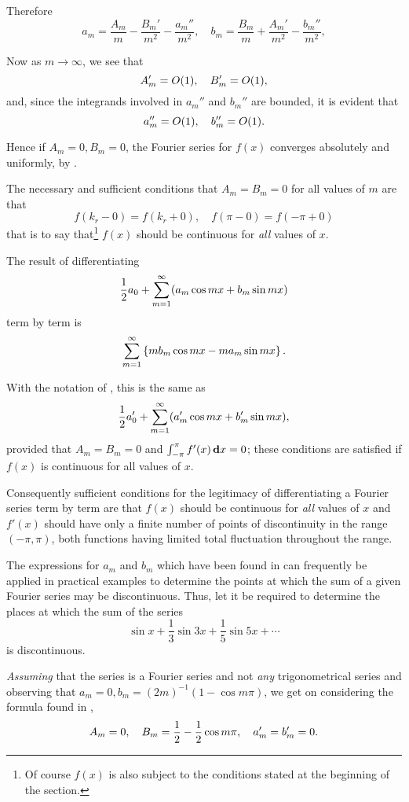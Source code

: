 Therefore
$$
a_{m} =
\frac{A_{m}}{m}
- \frac{B_{m}'}{m^{2}}
- \frac{a_{m}''}{m^{2}},
\quad
b_{m} =
\frac{B_{m}}{m}
+ \frac{A_{m}'}{m^{2}}
- \frac{b_{m}''}{m^{2}},
$$

Now as $m \rightarrow \infty$, we see that
$$
A_{m}' = O(1),
\quad
B_{m}' = O(1),
$$
and, since the integrands involved in $a_{m}''$ and $b_{m}''$
are bounded, it is evident that
$$
a_{m}'' = O(1),
\quad
b_{m}'' = O(1).
$$

Hence if $A_{m}=0, B_{m}=0$, the Fourier series for $f(x)$ converges
absolutely and uniformly, by .

The necessary and sufficient conditions that
$A_{m} = B_{m} = 0$ for all values of $m$ are that
$$
f(k_{r} - 0) = f(k_{r} + 0),
\quad
f(\pi - 0) = f(-\pi + 0)
$$
that is to say that\footnote{Of course $f(x)$ is also subject to the conditions stated at the
beginning of the section.} $f(x)$ should be continuous for \emph{all} values of $x$.

The result of differentiating
$$
\frac{1}{2} a_{0}
+ \sum_{m=1}^{\infty} (a_{m} \cos mx + b_{m} \sin mx)
$$
term by term is
$$
\sum_{m=1}^{\infty} \left\{ 
  m b_{m} \cos mx
  -
  m a_{m} \sin mx
 \right\}.
$$
%
%

With the notation of , this is the same as
$$
\frac{1}{2} a_{0}'
+
\sum_{m=1}^{\infty} ( a_{m}' \cos mx + b_{m}' \sin mx),
$$
provided that $A_{m} = B_{m} = 0$ and
$\int_{-\pi}^{\pi} f'(x) \, \mathbf{d} x = 0$;
these conditions are satisfied if $f(x)$ is continuous for all values of
$x$.

Consequently sufficient conditions for the legitimacy of
differentiating a Fourier series term by term are that $f(x)$ should be
continuous for \emph{all} values of $x$ and $f'(x)$ should have only a finite
number of points of discontinuity in the range $(-\pi, \pi)$, both
functions having limited total fluctuation throughout the range.


The expressions for $a_{m}$ and $b_{m}$ which have been found in
 can
frequently be applied in practical examples to determine the points
at which the sum of a given Fourier series may be discontinuous. Thus,
let it be required to determine the places at which the sum of the
series
$$
\sin x
+ \frac{1}{3} \sin 3x
+ \frac{1}{5} \sin 5x
+ \cdots
$$
is discontinuous.

\emph{Assuming} that the series is a Fourier series and not \emph{any}
trigonometrical series and observing that
$a_{m} = 0, b_{m} = (2m)^{-1}(1 - \cos m \pi)$, we get on considering the
formula found in ,
$$
A_{m} = 0,
\quad
B_{m} = \frac{1}{2} - \frac{1}{2} \cos m \pi,
\quad
a_{m}' = b_{m}' = 0.
$$

